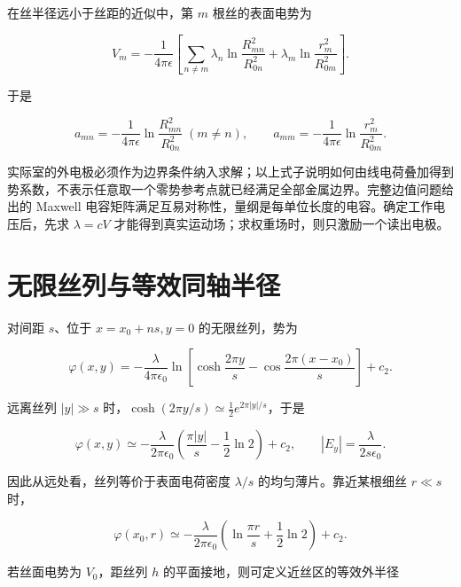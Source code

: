 \documentclass[
  11pt,
  a4paper,
  oneside,
  openany]{report}
\numberwithin{equation}{chapter}
\begin{document}
在丝半径远小于丝距的近似中，第 \(m\) 根丝的表面电势为

\begin{equation}
V_m=-\frac{1}{4\pi\epsilon}
\left[\sum_{n\ne m}\lambda_n\ln\frac{R_{mn}^2}{R_{0n}^2}
+\lambda_m\ln\frac{r_m^2}{R_{0m}^2}\right].
\end{equation}

于是

\begin{equation}
a_{mn}=-\frac{1}{4\pi\epsilon}\ln\frac{R_{mn}^2}{R_{0n}^2}\;(m\ne n),
\qquad a_{mm}=-\frac{1}{4\pi\epsilon}\ln\frac{r_m^2}{R_{0m}^2}.
\end{equation}

实际室的外电极必须作为边界条件纳入求解；以上式子说明如何由线电荷叠加得到势系数，不表示任意取一个零势参考点就已经满足全部金属边界。完整边值问题给出的
Maxwell
电容矩阵满足互易对称性，量纲是每单位长度的电容。确定工作电压后，先求
\(\lambda=cV\) 才能得到真实运动场；求权重场时，则只激励一个读出电极。

\section{无限丝列与等效同轴半径}\label{ux65e0ux9650ux4e1dux5217ux4e0eux7b49ux6548ux540cux8f74ux534aux5f84}

对间距 \(s\)、位于 \(x=x_0+ns,y=0\) 的无限丝列，势为

\begin{equation}
\varphi(x,y)=-\frac{\lambda}{4\pi\epsilon_0}
\ln\left[\cosh\frac{2\pi y}{s}
-\cos\frac{2\pi(x-x_0)}{s}\right]+c_2.
\end{equation}

远离丝列 \(|y|\gg s\)
时，\(\cosh(2\pi y/s)\simeq\tfrac12e^{2\pi|y|/s}\)，于是

\begin{equation}
\varphi(x,y)\simeq-\frac{\lambda}{2\pi\epsilon_0}
\left(\frac{\pi|y|}{s}-\frac12\ln2\right)+c_2,
\qquad |E_y|=\frac{\lambda}{2s\epsilon_0}.
\end{equation}

因此从远处看，丝列等价于表面电荷密度 \(\lambda/s\)
的均匀薄片。靠近某根细丝 \(r\ll s\) 时，

\begin{equation}
\varphi(x_0,r)\simeq-\frac{\lambda}{2\pi\epsilon_0}
\left(\ln\frac{\pi r}{s}+\frac12\ln2\right)+c_2.
\end{equation}

若丝面电势为 \(V_0\)，距丝列 \(h\)
的平面接地，则可定义近丝区的等效外半径
\end{document}
